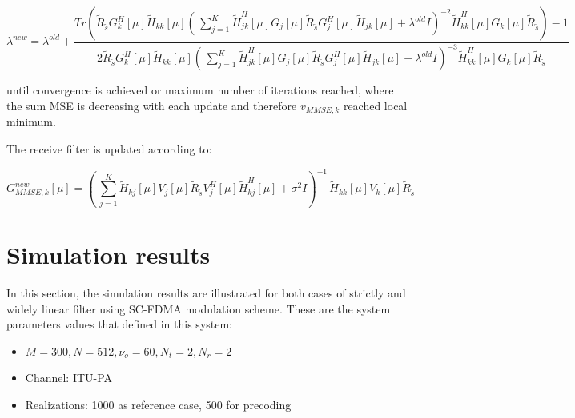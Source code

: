 \documentclass[12pt,a4paper,notitlepage,twoside,headsepline]{scrartcl}
\begin{document}
\begin{equation}
	\lambda^{new} = \lambda^{old} + \frac{Tr( \tilde{R}_{\tilde{s}} G_k^H[\mu] \tilde{H}_{kk}[\mu] ( \, \sum_{j=1}^{K}{\tilde{H}_{jk}^{H}[\mu] G_j[\mu] \tilde{R}_{\tilde{s}} G_j^H[\mu] \tilde{H}_{jk}[\mu] + \lambda^{old} I})^{-2} \tilde{H}_{kk}^H [\mu] G_k[\mu] \tilde{R}_{\tilde{s}}) - 1}{2 \tilde{R}_{\tilde{s}} G_k^H[\mu] \tilde{H}_{kk}[\mu] ( \, \sum_{j=1}^{K}{\tilde{H}_{jk}^{H}[\mu] G_j[\mu] \tilde{R}_{\tilde{s}} G_j^H[\mu] \tilde{H}_{jk}[\mu] + \lambda^{old} I})^{-3} \tilde{H}_{kk}^H [\mu] G_k[\mu] \tilde{R}_{\tilde{s}}}
\end{equation}

until convergence is achieved or maximum number of iterations reached, where the sum MSE is decreasing with each update and therefore $v_{MMSE,k}$ reached local minimum.

The receive filter is updated according to:

\begin{equation}
	G_{MMSE, k}^{new}[\mu] = ( \, \sum_{j=1}^{K}{\tilde{H}_{kj}[\mu] V_j[\mu] \tilde{R}_{\tilde{s}} V_j^H[\mu] \tilde{H}_{kj}^H[\mu] + \sigma^2 I})^{-1} \, \tilde{H}_{kk}[\mu] V_k[\mu] \tilde{R}_{\tilde{s}}
\end{equation}



\section{Simulation results}

In this section, the simulation results are illustrated for both cases of strictly and widely linear filter using SC-FDMA modulation scheme. These are the system parameters values that defined in this system:
\begin{itemize}
	\item $M = 300, N = 512, \nu_o = 60, N_t = 2, N_r = 2$
	\item Channel: ITU-PA
	\item Realizations: 1000 as reference case, 500 for precoding
\end{itemize}


\end{document}
